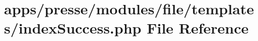 \hypertarget{presse_2modules_2file_2templates_2index_success_8php}{\section{apps/presse/modules/file/templates/index\-Success.php File Reference}
\label{presse_2modules_2file_2templates_2index_success_8php}
}
